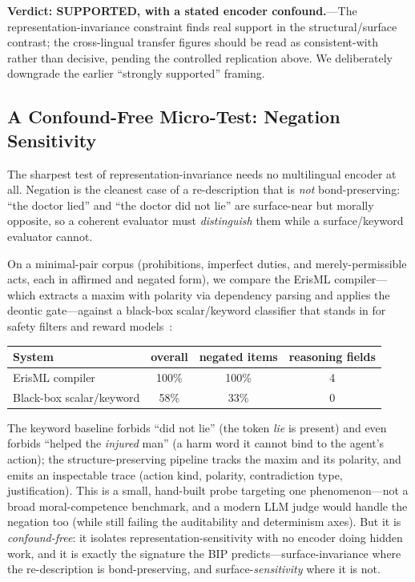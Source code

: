 \documentclass[12pt,letterpaper]{article}
\theoremstyle{definition}
\theoremstyle{remark}
\begin{document}
\textbf{Verdict: SUPPORTED, with a stated encoder confound.}---The representation-invariance constraint finds real support in the structural/surface contrast; the cross-lingual transfer figures should be read as consistent-with rather than decisive, pending the controlled replication above. We deliberately downgrade the earlier ``strongly supported'' framing.

\subsection{A Confound-Free Micro-Test: Negation Sensitivity}

The sharpest test of representation-invariance needs no multilingual encoder at all. Negation is the cleanest case of a re-description that is \emph{not} bond-preserving: ``the doctor lied'' and ``the doctor did not lie'' are surface-near but morally opposite, so a coherent evaluator must \emph{distinguish} them while a surface/keyword evaluator cannot.

On a minimal-pair corpus (prohibitions, imperfect duties, and merely-permissible acts, each in affirmed and negated form), we compare the ErisML compiler---which extracts a maxim with polarity via dependency parsing and applies the deontic gate---against a black-box scalar/keyword classifier that stands in for safety filters and reward models~\cite{bond2026erisml}:

\begin{center}
\begin{tabular}{lccc}
\toprule
\textbf{System} & \textbf{overall} & \textbf{negated items} & \textbf{reasoning fields} \\
\midrule
ErisML compiler        & 100\% & 100\% & 4 \\
Black-box scalar/keyword & 58\% & 33\% & 0 \\
\bottomrule
\end{tabular}
\end{center}

The keyword baseline forbids ``did not lie'' (the token \emph{lie} is present) and even forbids ``helped the \emph{injured} man'' (a harm word it cannot bind to the agent's action); the structure-preserving pipeline tracks the maxim and its polarity, and emits an inspectable trace (action kind, polarity, contradiction type, justification). This is a small, hand-built probe targeting one phenomenon---not a broad moral-competence benchmark, and a modern LLM judge would handle the negation too (while still failing the auditability and determinism axes). But it is \emph{confound-free}: it isolates representation-sensitivity with no encoder doing hidden work, and it is exactly the signature the BIP predicts---surface-invariance where the re-description is bond-preserving, and surface-\emph{sensitivity} where it is not.
\end{document}
